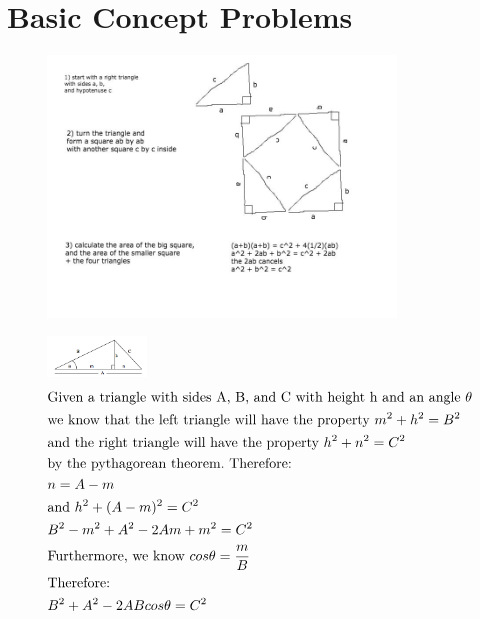 \documentclass{article}%
\begin{document}
%
\normalsize%
\section{Basic Concept Problems}%


\begin{figure}[h!]%
\centering%
\includegraphics[width=350px]{pythagorean.jpg}%
\end{figure}

%


\begin{figure}[h!]%
\centering%
\includegraphics[width=100px]{triangle.jpg}%
\begin{alignat*}{2}%
&\textnormal{Given a triangle with sides A, B, and C }%
\textnormal{with height h and an angle } \theta\\%
& \textnormal{we know that the left triangle will}%
\textnormal{ have the property } m^2+h^2=B^2\\%
&\textnormal{and the right triangle will have the property }%
 h^2 + n^2 = C^2\\ &\textnormal{by the pythagorean theorem.}%
\textnormal{ Therefore:}\\%
&n = A - m\\%
&\textnormal{and } h^2 + (A-m)^2 = C^2\\%
&B^2-m^2+A^2-2Am+m^2 = C^2\\%
&\textnormal{Furthermore, we know } cos\theta = \frac{m}{B}\\%
&\textnormal{Therefore:}\\%
&B^2+A^2 -2ABcos\theta = C^2%
\end{alignat*}%
\end{figure}
\end{document}

